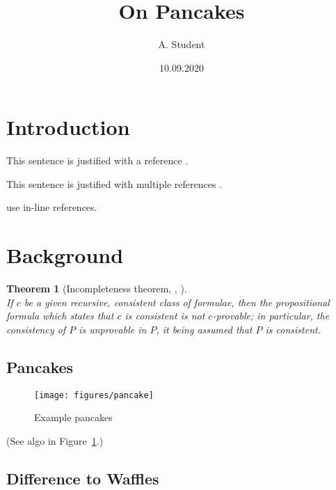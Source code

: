 \documentclass{article}
\author{A. Student}
\title{On Pancakes}
\date{10.09.2020}
\newtheorem{theorem}{Theorem}
\begin{document}
\maketitle

\begin{abstract}
  \lipsum[1]
\end{abstract}

\section{Introduction}
This sentence is justified with a reference \citep{hofstadter-1979}.

This sentence is justified with multiple references \citep{hofstadter-1979,godel-mmp1931,prusinkiewicz-csiro1996}.

\citet{prusinkiewicz-csiro1996} use in-line references.

\lipsum[4]

\section{Background}

\lipsum[1]
\begin{theorem}[Incompleteness theorem, \citeauthor{godel-mmp1931}, \citeyear{godel-mmp1931}]~\\
    If $c$ be a given recursive, consistent class of formulae, then the
    propositional formula which states that $c$ is consistent is not
    $c$-provable; in particular, the consistency of $P$ is unprovable in $P$, it
    being assumed that $P$ is consistent.
\end{theorem}

\subsection{Pancakes}

\begin{figure}
    \centering
    \texttt{[image: figures/pancake]}
    \caption{Example pancakes}
    \label{fig-pancake}
\end{figure}

\lipsum[3]
(See algo in Figure~\ref{fig-pancake}.)


\subsection{Difference to Waffles}
\lipsum[2]




\end{document}
